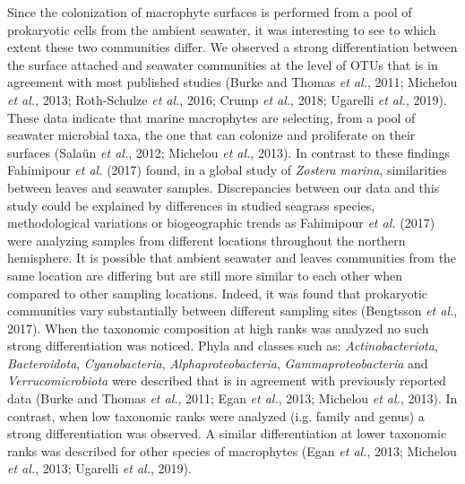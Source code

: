 \documentclass[12pt,]{article}
\begin{document}
Since the colonization of macrophyte surfaces is performed from a pool
of prokaryotic cells from the ambient seawater, it was interesting to
see to which extent these two communities differ. We observed a strong
differentiation between the surface attached and seawater communities at
the level of OTUs that is in agreement with most published studies
(Burke and Thomas \emph{et al.}, 2011; Michelou \emph{et al.}, 2013;
Roth-Schulze \emph{et al.}, 2016; Crump \emph{et al.}, 2018; Ugarelli
\emph{et al.}, 2019). These data indicate that marine macrophytes are
selecting, from a pool of seawater microbial taxa, the one that can
colonize and proliferate on their surfaces (Salaün \emph{et al.}, 2012;
Michelou \emph{et al.}, 2013). In contrast to these findings Fahimipour
\emph{et al.} (2017) found, in a global study of \emph{Zostera marina},
similarities between leaves and seawater samples. Discrepancies between
our data and this study could be explained by differences in studied
seagrass species, methodological variations or biogeographic trends as
Fahimipour \emph{et al.} (2017) were analyzing samples from different
locations throughout the northern hemisphere. It is possible that
ambient seawater and leaves communities from the same location are
differing but are still more similar to each other when compared to
other sampling locations. Indeed, it was found that prokaryotic
communities vary substantially between different sampling sites
(Bengtsson \emph{et al.}, 2017). When the taxonomic composition at high
ranks was analyzed no such strong differentiation was noticed. Phyla and
classes such as: \emph{Actinobacteriota}, \emph{Bacteroidota},
\emph{Cyanobacteria}, \emph{Alphaproteobacteria},
\emph{Gammaproteobacteria} and \emph{Verrucomicrobiota} were described
that is in agreement with previously reported data (Burke and Thomas
\emph{et al.}, 2011; Egan \emph{et al.}, 2013; Michelou \emph{et al.},
2013). In contrast, when low taxonomic ranks were analyzed (i.g. family
and genus) a strong differentiation was observed. A similar
differentiation at lower taxonomic ranks was described for other species
of macrophytes (Egan \emph{et al.}, 2013; Michelou \emph{et al.}, 2013;
Ugarelli \emph{et al.}, 2019).
\end{document}
